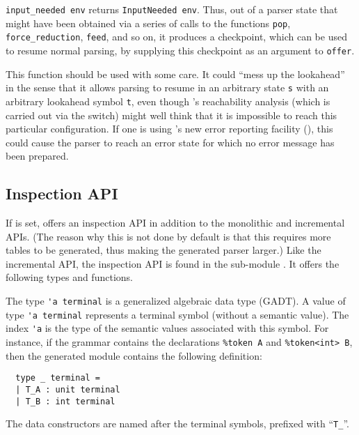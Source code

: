 \documentclass[onecolumn,11pt,nocopyrightspace,preprint]{sigplanconf}
\begin{document}
\verb+input_needed env+ returns \verb+InputNeeded env+. Thus, out of a parser
state that might have been obtained via a series of calls to the functions
\verb+pop+, \verb+force_reduction+, \verb+feed+, and so on, it produces a
checkpoint, which can be used to resume normal parsing, by supplying this
checkpoint as an argument to \verb+offer+.

This function should be used with some care. It could ``mess up the
lookahead'' in the sense that it allows parsing to resume in an arbitrary
state \verb+s+ with an arbitrary lookahead symbol \verb+t+, even though
\menhir's reachability analysis (which is carried out via the \olisterrors
switch) might well think that it is impossible to reach this particular
configuration. If one is using \menhir's new error reporting facility
(), this could cause the parser to reach an error state
for which no error message has been prepared.


\subsection{Inspection API}
\label{sec:inspection}

If \oinspection is set, \menhir offers an inspection API in addition to the
monolithic and incremental APIs. (The reason why this is not done by default
is that this requires more tables to be generated, thus making the generated
parser larger.) Like the incremental API, the inspection API is found in the
sub-module \menhirinterpreter. It offers the following types and functions.


The type \verb+'a terminal+ is a generalized algebraic data type (GADT). A
value of type \verb+'a terminal+ represents a terminal symbol (without a
semantic value). The index \verb+'a+ is the type of the semantic values
associated with this symbol. For instance, if the grammar contains the
declarations \verb+%token A+ and \verb+%token<int> B+, then the generated
module \menhirinterpreter contains the following definition:
%
\begin{verbatim}
  type _ terminal =
  | T_A : unit terminal
  | T_B : int terminal
\end{verbatim}
%
The data constructors are named after the terminal symbols, prefixed with ``\verb+T_+''.

\end{document}
